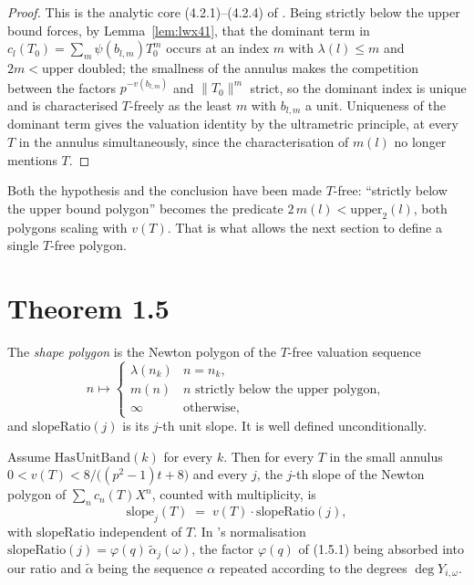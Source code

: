 \begin{proof}
  \leanok
  This is the analytic core (4.2.1)--(4.2.4) of \cite{LWX}.  Being strictly below the upper bound
  forces, by Lemma~\ref{lem:lwx41}, that the dominant term in
  $c_l(T_0) = \sum_m \psi(b_{l,m})T_0^{m}$ occurs at an index $m$ with
  $\lambda(l)\leq m$ and $2m < \mathrm{upper}$ doubled; the smallness of the annulus makes the
  competition between the factors $p^{-v(b_{l,m})}$ and $\lVert T_0\rVert^{m}$ strict, so the
  dominant index is unique and is characterised $T$-freely as the least $m$ with $b_{l,m}$ a
  unit.  Uniqueness of the dominant term gives the valuation identity by the ultrametric
  principle, at every $T$ in the annulus simultaneously, since the characterisation of $m(l)$ no
  longer mentions $T$.
\end{proof}

Both the hypothesis and the conclusion have been made $T$-free: ``strictly below the upper bound
polygon'' becomes the predicate $2\,m(l) < \mathrm{upper}_{2}(l)$, both polygons scaling with
$v(T)$.  That is what allows the next section to define a single $T$-free polygon.

\section{Theorem 1.5}

\begin{definition}
  \label{def:shapepolygon}
  \leanok
  The \emph{shape polygon} is the Newton polygon of the $T$-free valuation sequence
  \[
    n \longmapsto
    \begin{cases}
      \lambda(n_k) & n = n_k, \\
      m(n) & n \text{ strictly below the upper polygon}, \\
      \infty & \text{otherwise},
    \end{cases}
  \]
  and $\mathrm{slopeRatio}(j)$ is its $j$-th unit slope.  It is well defined unconditionally.
\end{definition}

\begin{theorem}
  \label{thm:lwx15}
  \leanok
  Assume $\mathrm{HasUnitBand}(k)$ for every $k$.  Then for every $T$ in the small annulus
  $0 < v(T) < 8/\bigl((p^{2}-1)t+8\bigr)$ and every $j$, the $j$-th slope of the Newton polygon
  of $\sum_n c_n(T)X^{n}$, counted with multiplicity, is
  \[
    \mathrm{slope}_j(T) \;=\; v(T)\cdot\mathrm{slopeRatio}(j),
  \]
  with $\mathrm{slopeRatio}$ independent of $T$.  In \cite{LWX}'s normalisation
  $\mathrm{slopeRatio}(j) = \varphi(q)\,\tilde\alpha_j(\omega)$, the factor $\varphi(q)$ of
  (1.5.1) being absorbed into our ratio and $\tilde\alpha$ being the sequence $\alpha$ repeated
  according to the degrees $\deg Y_{i,\omega}$.
\end{theorem}

